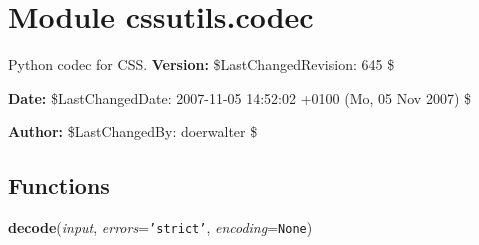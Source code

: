 %
%
%


\section{Module cssutils.codec}

    \label{cssutils:codec}

Python codec for CSS.
\textbf{Version:} \$LastChangedRevision: 645 \$



\textbf{Date:} \$LastChangedDate: 2007-11-05 14:52:02 +0100 (Mo, 05 Nov 2007) \$



\textbf{Author:} \$LastChangedBy: doerwalter \$





  \subsection{Functions}

    \label{cssutils:codec:decode}

    \vspace{0.5ex}

\hspace{.8\funcindent}\begin{boxedminipage}{\funcwidth}

    \raggedright \textbf{decode}(\textit{input}, \textit{errors}={\tt \texttt{'}\texttt{strict}\texttt{'}}, \textit{encoding}={\tt None})

\setlength{\parskip}{2ex}
\setlength{\parskip}{1ex}
    \end{boxedminipage}

    \label{cssutils:codec:encode}

